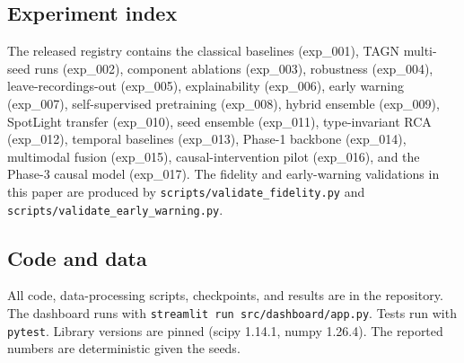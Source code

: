 \documentclass[conference]{IEEEtran}
\begin{document}
\subsection{Experiment index}
The released registry contains the classical baselines (exp\_001), TAGN multi-seed runs (exp\_002), component ablations (exp\_003), robustness (exp\_004), leave-recordings-out (exp\_005), explainability (exp\_006), early warning (exp\_007), self-supervised pretraining (exp\_008), hybrid ensemble (exp\_009), SpotLight transfer (exp\_010), seed ensemble (exp\_011), type-invariant RCA (exp\_012), temporal baselines (exp\_013), Phase-1 backbone (exp\_014), multimodal fusion (exp\_015), causal-intervention pilot (exp\_016), and the Phase-3 causal model (exp\_017). The fidelity and early-warning validations in this paper are produced by \texttt{scripts/validate\_fidelity.py} and \texttt{scripts/validate\_early\_warning.py}.

\subsection{Code and data}
All code, data-processing scripts, checkpoints, and results are in the repository. The dashboard runs with \texttt{streamlit run src/dashboard/app.py}. Tests run with \texttt{pytest}. Library versions are pinned (scipy 1.14.1, numpy 1.26.4). The reported numbers are deterministic given the seeds.



\end{document}
